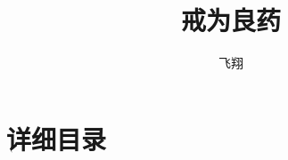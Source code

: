 \documentclass{ctexart}
\title{戒为良药}
\author{飞翔}
\date{}
\begin{document}
\maketitle
\begin{multicols}{2}
\end{multicols}\clearpage

% 

% 
% 
% 
% 
% 
% 
% 
% 
% 
% 
% 
% 
% 
% 
% 
% 
% 
% 
% 
% 
% 
% 
% 
% 
% 
% 
% 
% 
% 
% 
% 
% 
% 
% 
% 
% 
% 
% 
% 


\clearpage\appendix

\section{详细目录}

\setcounter{tocdepth}{4}
\renewcommand*{\contentsname}{}
\begin{multicols}{2}
    \tableofcontents
\end{multicols}
\end{document}
